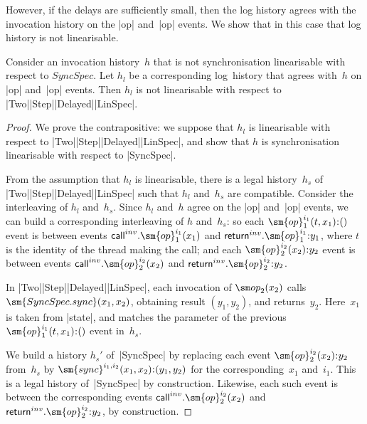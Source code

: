 

However, if the delays are sufficiently small, then the
log history agrees with the invocation history on the |op| and~|op|
events.  We show that in this case that log history is not linearisable.
%
\begin{lemma}
Consider an invocation history~$h$ that is not synchronisation linearisable
with respect to $SyncSpec$.  Let $h_l$ be a corresponding log~history that
agrees with~$h$ on |op| and~|op| events.  Then $h_l$ is not linearisable
with respect to |Two|\-|Step|\-|Delayed|\-|LinSpec|.
\end{lemma}


\begin{proof}
We prove the contrapositive: we suppose that $h_l$ is linearisable with
respect to |Two|\-|Step|\-|Delayed|\-|LinSpec|, and show that $h$ is
synchronisation linearisable with respect to |SyncSpec|. 

From the assumption that $h_l$ is linearisable, there is a legal history~$h_s$
of |Two|\-|Step|\-|Delayed|\-|LinSpec| such that $h_l$ and~$h_s$ are
compatible.  Consider the interleaving of $h_l$ and~$h_s$.  Since $h_l$
and~$h$ agree on the |op| and~|op| events, we can build a corresponding
interleaving of $h$ and~$h_s$: so each $\sm{op}_1^{i_1}(t,x_1)\::()$ event is
between events $\call^{inv}.\sm{op}_1^{i_1}(x_1)$ and
$\return^{inv}.\sm{op}_1^{i_1} \:: y_1$, where $t$ is the identity of the
thread making the call; and each $\sm{op}_2^{i_2}(x_2)\::y_2$ event is
between events $\call^{inv}.\sm{op}_2^{i_2}(x_2)$ and
$\return^{inv}.\sm{op}_2^{i_2} \:: y_2$.   

In |Two|\-|Step|\-|Delayed|\-|LinSpec|, each invocation of $\op_2(x_2)$ calls
$\sm{SyncSpec.sync}(x_1, x_2)$, obtaining result $(y_1, y_2)$, and
returns~$y_2$.  Here~$x_1$ is taken from |state|, and matches the parameter
of the previous  $\sm{op}_1^{i_1}(t,x_1)\::()$ event in~$h_s$.

%
We build a history $h_s'$ of~|SyncSpec| by replacing each event
$\sm{op}_2^{i_2}(x_2)\::y_2$ from~$h_s$ by $\sm{sync}^{i_1,i_2}(x_1, x_2) \::
(y_1,y_2)$ for the corresponding~$x_1$ and~$i_1$.  This is a legal history
of~|SyncSpec| by construction.  Likewise, each such event is between the
corresponding events $\call^{inv}.\sm{op}_2^{i_2}(x_2)$ and
$\return^{inv}.\sm{op}_2^{i_2} \:: y_2$, by construction.  

\end{proof}



